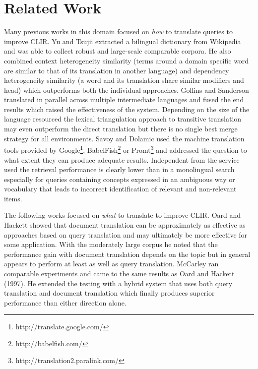 \documentclass[journal]{IEEEtran}
\begin{document}



\section{Related Work}
Many previous works in this domain focused on \textit{how} to translate queries to improve CLIR.
Yu and Tsujii \cite{yu09} extracted a bilingual dictionary from Wikipedia and was able to collect robust and large-scale comparable corpora.
He also combined context heterogeneity similarity (terms around a domain specific word are similar to that of its translation in another language) and dependency heterogeneity similarity (a word and its translation share similar modifiers and head) which outperforms both the individual approaches.
Gollins and Sanderson \cite{gollins01} translated in parallel across multiple intermediate languages and fused the end results which raised the effectiveness of the system.
Depending on the size of the language resourced the lexical triangulation approach to transitive translation may even outperform the direct translation but there is no single best merge strategy for all environments.
Savoy and Dolamic \cite{savoy09} used the machine translation tools provided by Google\footnote{http://translate.google.com/}, BabelFish\footnote{http://babelfish.com/} or Promt\footnote{http://translation2.paralink.com/} and addressed the question to what extent they can produce adequate results.
Independent from the service used the retrieval performance is clearly lower than in a monolingual search especially for queries containing concepts expressed in an ambiguous way or vocabulary that leads to incorrect identification of relevant and non-relevant items.

The following works focused on \textit{what} to translate to improve CLIR.
Oard and Hackett \cite{oard97b} showed that document translation can be approximately as effective as approaches based on query translation and may ultimately be more effective for some application.
With the moderately large corpus he noted that the performance gain with document translation depends on the topic but in general appears to perform at least as well as query translation.
McCarley \cite{mccarley99} ran comparable experiments and came to the same results as Oard and Hackett (1997).
He extended the testing with a hybrid system that uses both query translation and document translation which finally produces superior performance than either direction alone.
\end{document}
